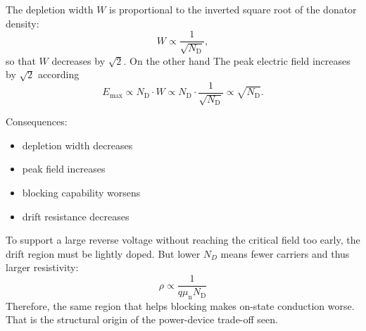
\begin{solutionblock}
    The depletion width $W$ is proportional to the inverted square root of the donator density:
        \begin{equation}   
            W \propto \frac{1}{\sqrt{N_\mathrm{D}}},
        \end{equation}     
    so that $W$ decreases by $\sqrt{2}$. On the other hand The peak electric field increases by $\sqrt{2}$ according
        \begin{equation}   
            E_\mathrm{\max} \propto N_\mathrm{D} \cdot W \propto N_\mathrm{D} \cdot \frac{1}{\sqrt{N_\mathrm{D}}} \propto \sqrt{N_\mathrm{D}}.
        \end{equation}    
    
    Consequences:
    \begin{itemize}
        \item depletion width decreases
        \item peak field increases
        \item blocking capability worsens
        \item drift resistance decreases
    \end{itemize}
\end{solutionblock} 


\begin{solutionblock}
    To support a large reverse voltage without reaching the critical field too early, the drift region must be lightly doped. 
    But lower $N_D$ means fewer carriers and thus larger resistivity:
        \begin{equation*}   
            \rho \propto \frac{1}{q \mu_\mathrm{n} N_\mathrm{D}}
        \end{equation*}  
    Therefore, the same region that helps blocking makes on-state conduction worse. 
    That is the structural origin of the power-device trade-off seen.
\end{solutionblock} 

